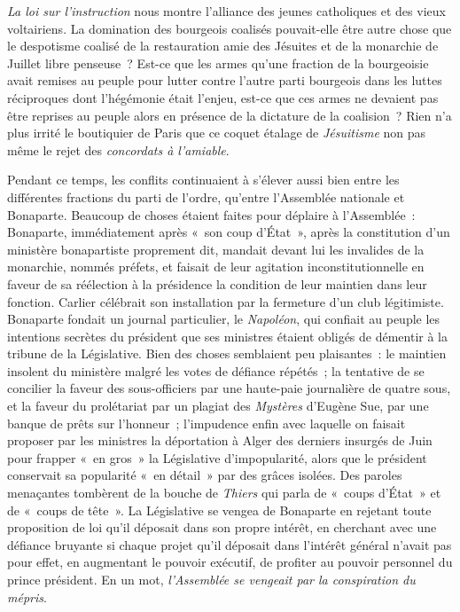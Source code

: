 \documentclass[twoside]{book} %
\begin{document}
\emph{La loi sur l’instruction} nous montre l’alliance des jeunes catholiques et des vieux voltairiens. La domination des bourgeois coalisés pouvait-elle être autre chose que le despotisme coalisé de la restauration amie des Jésuites et de la monarchie de Juillet libre penseuse ? Est-ce que les armes qu’une fraction de la bourgeoisie avait remises au peuple pour lutter contre l’autre parti bourgeois dans les luttes réciproques dont l’hégémonie était l’enjeu, est-ce que ces armes ne devaient pas être reprises au peuple alors en présence de la dictature de la coalision ? Rien n’a plus irrité le boutiquier de Paris que ce coquet étalage de \emph{Jésuitisme} non pas même le rejet des \emph{concordats à l’amiable}.\par
Pendant ce temps, les conflits continuaient à s’élever aussi bien entre les différentes fractions du parti de l’ordre, qu’entre l’Assemblée nationale et Bonaparte. Beaucoup de choses étaient faites pour déplaire à l’Assemblée : Bonaparte, immédiatement après « son coup d’État », après la constitution d’un ministère bonapartiste proprement dit, mandait devant lui les invalides de la monarchie, nommés préfets, et faisait de leur agitation inconstitutionnelle en faveur de sa réélection à la présidence la condition de leur maintien dans leur fonction. Carlier célébrait son installation par la fermeture d’un club légitimiste. Bonaparte fondait un journal particulier, le \emph{Napoléon}, qui confiait au peuple les intentions secrètes du président que ses ministres étaient obligés de démentir à la tribune de la Législative. Bien des choses semblaient peu plaisantes : le maintien insolent du ministère malgré les votes de défiance répétés ; la tentative de se concilier la faveur des sous-officiers par une haute-paie journalière de quatre sous, et la faveur du prolétariat par un plagiat des \emph{Mystères} d’Eugène Sue, par une banque de prêts sur l’honneur ; l’impudence enfin avec laquelle on faisait proposer par les ministres la déportation à Alger des derniers insurgés de Juin pour frapper « en gros » la Législative d’impopularité, alors que le président conservait sa popularité « en détail » par des grâces isolées. Des paroles menaçantes tombèrent de la bouche de \emph{Thiers} qui parla de « coups d’État » et de « coups de tête ». La Législative se vengea de Bonaparte en rejetant toute proposition de loi qu’il déposait dans son propre intérêt, en cherchant avec une défiance bruyante si chaque projet qu’il déposait dans l’intérêt général n’avait pas pour effet, en augmentant le pouvoir exécutif, de profiter au pouvoir personnel du prince président. En un mot, \emph{l’Assemblée se vengeait par la conspiration du mépris}.\par
\end{document}
